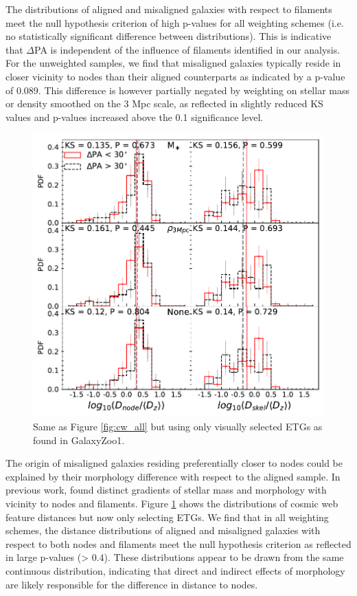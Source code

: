 The distributions of aligned and misaligned galaxies with respect to filaments meet the null hypothesis criterion of high p-values for all weighting schemes (i.e. no statistically significant difference between distributions). This is indicative that $\Delta$PA is independent of the influence of filaments identified in our analysis. For the unweighted samples, we find that misaligned galaxies typically reside in closer vicinity to nodes than their aligned counterparts as indicated by a p-value of 0.089. This difference is however partially negated by weighting on stellar mass or density smoothed on the 3 Mpc scale, as reflected in slightly reduced KS values and p-values increased above the 0.1 significance level.

\begin{figure}
    \centering
	\includegraphics[width=0.9\linewidth]{thesis/latex/halo_assembly_manga/PA_ET_CW.pdf}
    \caption{Same as Figure \ref{fig:cw_all} but using only visually selected ETGs as found in GalaxyZoo1.}
    \label{fig:cw_et}
\end{figure}

The origin of misaligned galaxies residing preferentially closer to nodes could be explained by their morphology difference with respect to the aligned sample. In previous work, \citet{kraljic2018} found distinct gradients of stellar mass and morphology with vicinity to nodes and filaments. Figure \ref{fig:cw_et} shows the distributions of cosmic web feature distances but now only selecting ETGs. We find that in all weighting schemes, the distance distributions of aligned and misaligned galaxies with respect to both nodes and filaments meet the null hypothesis criterion as reflected in large p-values (> 0.4). These distributions appear to be drawn from the same continuous distribution, indicating that direct and indirect effects of morphology are likely responsible for the difference in distance to nodes. 

